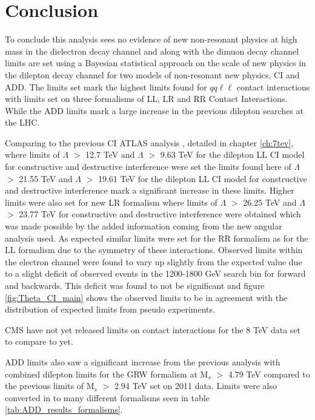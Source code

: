 \chapter{Conclusion}

To conclude this analysis sees no evidence of new non-resonant physics at high mass in the dielectron decay channel and along with the dimuon decay channel limits are set using a Bayesian statistical approach on the scale of new physics in the dilepton decay channel for two models of non-resonant new physics, CI and ADD. The limits set mark the highest limits found for $qq\ell\ell$ contact interactions with limits set on three formalisms of LL, LR and RR Contact Interactions. While the ADD limits mark a large increase in the previous dilepton searches at the LHC.

Comparing to the previous CI ATLAS analysis \cite{PhysRevD.87.015010}, detailed in chapter \ref{ch:7tev}, where limits of $\Lambda$ $>$ 12.7 TeV and $\Lambda$ $>$ 9.63 TeV for the dilepton LL CI model for constructive and destructive interference were set the limits found here of $\Lambda$ $>$ 21.55 TeV and $\Lambda$ $>$ 19.61 TeV for the dilepton LL CI model for constructive and destructive interference mark a significant increase in these limits. Higher limits were also set for new LR formalism where limits of $\Lambda$ $>$ 26.25 TeV and $\Lambda$ $>$ 23.77 TeV for constructive and destructive interference were obtained which was made possible by the added information coming from the new angular analysis used. As expected similar limits were set for the RR formalism as for the LL formalism due to the symmetry of these interactions. Observed limits within the electron channel were found to vary up slightly from the expected value due to a slight deficit of observed events in the 1200-1800 GeV search bin for forward and backwards. This deficit was found to not be significant and figure \ref{fig:Theta_CI_main} shows the observed limits to be in agreement with the distribution of expected limits from pseudo experiments.

CMS have not yet released limits on contact interactions for the 8 TeV data set to compare to yet.

ADD limits also saw a significant increase from the previous analysis \cite{PhysRevD.87.015010} with combined dilepton limits for the GRW formalism at M$_{s}$ $>$ 4.79 TeV compared to the previous limits of M$_{s}$ $>$ 2.94 TeV set on 2011 data. Limits were also converted in to many different formalisms seen in table \ref{tab:ADD_results_formalisms}. 

